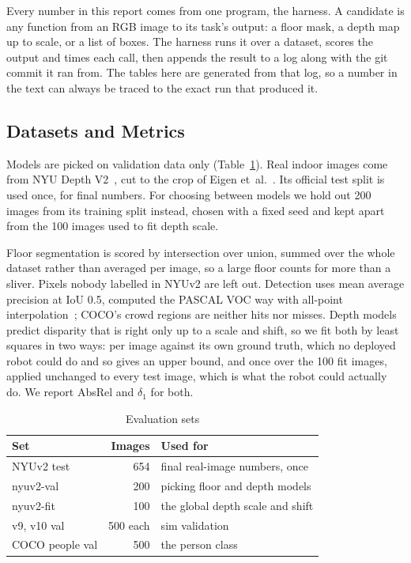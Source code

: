 \documentclass[conference]{IEEEtran}
\begin{document}
Every number in this report comes from one program, the harness. A candidate
is any function from an RGB image to its task's output: a floor mask, a depth
map up to scale, or a list of boxes. The harness runs it over a dataset,
scores the output and times each call, then appends the result to a log
along with the git commit it ran from. The tables here are generated from
that log, so a number in the text can always be traced to the exact run that
produced it.

\subsection{Datasets and Metrics}

Models are picked on validation data only (Table~\ref{tab:evalsets}). Real
indoor images come from NYU Depth V2~\cite{silberman2012indoor}, cut to the
crop of Eigen et~al.~\cite{eigen2014depth}. Its official test split is used
once, for final numbers. For choosing between models we hold out 200 images
from its training split instead, chosen with a fixed seed and kept apart from
the 100 images used to fit depth scale.

Floor segmentation is scored by intersection over union, summed over the
whole dataset rather than averaged per image, so a large floor counts for
more than a sliver. Pixels nobody labelled in NYUv2 are left out. Detection
uses mean average precision at IoU 0.5, computed the PASCAL VOC way with
all-point interpolation~\cite{everingham2010pascal}; COCO's crowd regions are
neither hits nor misses. Depth models predict disparity that is right only up
to a scale and shift, so we fit both by least squares in two ways: per image
against its own ground truth, which no deployed robot could do and so gives
an upper bound, and once over the 100 fit images, applied unchanged to every
test image, which is what the robot could actually do. We report AbsRel and
$\delta_1$ for both.

\begin{table}[t]
\caption{Evaluation sets}
\label{tab:evalsets}
\centering
\small
\begin{tabular}{@{}lrl@{}}
\toprule
Set & Images & Used for \\
\midrule
NYUv2 test & 654 & final real-image numbers, once \\
nyuv2-val & 200 & picking floor and depth models \\
nyuv2-fit & 100 & the global depth scale and shift \\
v9, v10 val & 500 each & sim validation \\
COCO people val & 500 & the person class \\
\bottomrule
\end{tabular}
\end{table}
\end{document}
